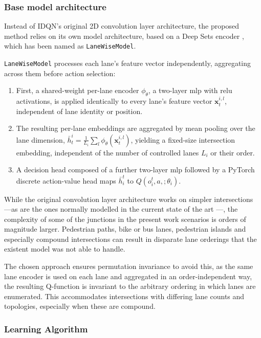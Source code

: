 \subsubsection{Base model architecture} \label{subsubsec:idqnmm_architecture}

Instead of IDQN's original 2D convolution layer architecture, the proposed method relies on its own model architecture, based on a Deep Sets encoder \cite{Zaheer2017}, which has been named as \texttt{LaneWiseModel}.

\texttt{LaneWiseModel} processes each lane's feature vector independently, aggregating across them before action selection:
 
\begin{enumerate}
\item First, a shared-weight per-lane encoder $\phi_\theta$, a
two-layer \acrfull{mlp} with \acrfull{relu} activations, is applied identically to every lane's feature
vector $\bm{x}_t^{i,l}$, independent of lane identity or position.
\item The resulting per-lane embeddings are aggregated by mean pooling over the lane dimension,
$\bar h_t^i = \frac{1}{L_i}\sum_{l} \phi_\theta(\bm{x}_t^{i,l})$, yielding a fixed-size intersection embedding, independent of the  number of controlled lanes $L_i$ or their order.
\item A decision head composed of a further two-layer \gls{mlp} followed by a PyTorch discrete action-value head maps
$\bar h_i^t$ to $Q(o_i^t, a,;\theta_i)$.
\end{enumerate}

While the original convolution layer architecture works on simpler intersections —as are the ones normally modelled in the current state of the art \cite{Liu2017,Ault2021, Zhu2022, Chen2025}—, the complexity of some of the junctions in the present work scenarios is orders of magnitude larger. Pedestrian paths, bike or bus lanes, pedestrian islands and especially compound intersections can result in disparate lane orderings that the existent model was not able to handle.

The chosen approach ensures permutation invariance to avoid this, as the same lane encoder is used on each lane and aggregated in an order-independent way, the resulting Q-function is invariant to the arbitrary ordering in which lanes are enumerated. This accommodates intersections with differing lane counts and topologies, especially when these are compound.
 
\subsubsection{Learning Algorithm} \label{subsubsec:idqn_learn_algo}
 
